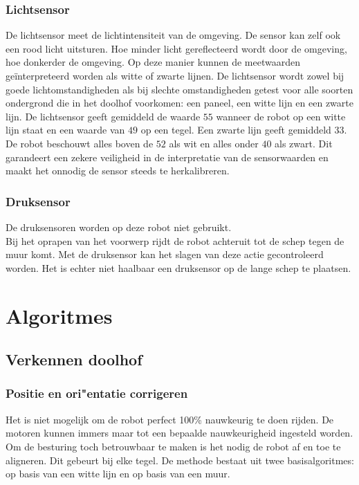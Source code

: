 \documentclass[tt3]{penoverslag}
\begin{document}

\subsubsection{Lichtsensor}
De lichtsensor meet de lichtintensiteit van de omgeving. De sensor kan zelf ook een rood licht uitsturen. Hoe minder licht gereflecteerd wordt door de omgeving, hoe donkerder de omgeving. Op deze manier kunnen de meetwaarden ge\"interpreteerd worden als witte of zwarte lijnen.
De lichtsensor wordt zowel bij goede lichtomstandigheden als bij slechte omstandigheden getest voor alle soorten ondergrond die in het doolhof voorkomen: een paneel, een witte lijn en een zwarte lijn.
De lichtsensor geeft gemiddeld de waarde $55$ wanneer de robot op een witte lijn staat en een waarde van $49$ op een tegel. Een zwarte lijn geeft gemiddeld $33$. De robot beschouwt alles boven de $52$ als wit en alles onder $40$ als zwart. Dit garandeert een zekere veiligheid in de interpretatie van de sensorwaarden en maakt het onnodig de sensor steeds te herkalibreren.


\subsubsection{Druksensor}
\label{ssecc:druksensor}
De druksensoren worden op deze robot niet gebruikt.\\

Bij het oprapen van het voorwerp rijdt de robot achteruit tot de schep tegen de muur komt. Met de druksensor kan het slagen van deze actie gecontroleerd worden. Het is echter niet haalbaar een druksensor op de lange schep te plaatsen.

\section{Algoritmes}
\label{sec:Algo}

\subsection{Verkennen doolhof}
\label{ssec: verkenDool}
\subsubsection{Positie en ori"entatie corrigeren}
\label{ssec:AlgoAllign}
Het is niet mogelijk om de robot perfect 100\% nauwkeurig te doen rijden. De motoren kunnen immers maar tot een bepaalde nauwkeurigheid ingesteld worden. Om de besturing toch betrouwbaar te maken is het nodig de robot af en toe te aligneren. Dit gebeurt bij elke tegel. %
De methode bestaat uit twee basisalgoritmes: op basis van een witte lijn en op basis van een muur.
\end{document}
